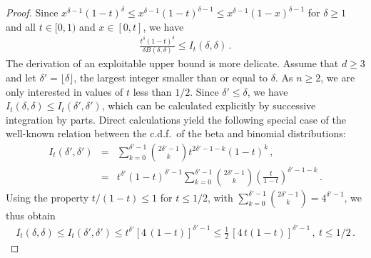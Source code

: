 \documentclass{article}
\newcommand{\AZ}{\textcolor{blue}}
\newcommand{\bea}{\begin{eqnarray*}}
\newcommand{\eea}{\end{eqnarray*}}
\newcommand{\be}{\begin{eqnarray}}
\newcommand{\ee}{\end{eqnarray}}
\begin{document}
\begin{proof}
Since $x^{\delta-1}(1-t)^\delta\leq x^{\delta-1}(1-t)^{\delta-1}\leq x^{\delta-1}(1-x)^{\delta-1}$ for $\delta\geq 1$ and all $t\in[0,1)$ and $x\in[0,t]$, we have
\be\label{It-ineq1}
\frac{t^\delta (1-t)^\delta}{\delta B(\delta,\delta)} \leq I_t(\delta,\delta) \,. %
\ee
The derivation of an exploitable upper bound is more delicate.
Assume that $d \geq 3$ and let
$\delta'=\lfloor \delta \rfloor$, the largest integer smaller than or equal to $\delta$.
As $n\geq 2$, we are only interested in values of $t$ less than $1/2$. Since $\delta'\leq \delta$, we have $I_t(\delta,\delta) \leq I_t(\delta',\delta')$, which
can be calculated explicitly by successive integration by parts. Direct calculations yield the following special case of the well-known relation between the c.d.f.\ of the beta and binomial distributions:
\be\label{It1}
I_t(\delta',\delta') &=& \sum_{k=0}^{\delta'-1} \binom{2\delta'-1}{k} t^{2\delta'-1-k}(1-t)^k \,, \\
&=& t^{\delta'}(1-t)^{\delta'-1} \sum_{k=0}^{\delta'-1} \binom{2\delta'-1}{k} \left(\frac{t}{1-t}\right)^{\delta'-1-k} \,.
\ee
Using the property $t/(1-t) \leq 1$ for $t\leq 1/2$, with $\sum_{k=0}^{\delta'-1} \binom{2\delta'-1}{k}=4^{\delta'-1}$, we thus obtain
\be \label{upper_bound}
I_t(\delta,\delta) \leq I_t(\delta',\delta') \leq t^{\delta'}[4\,(1-t)]^{\delta'-1} \leq \frac12\,[4\,t(1-t)]^{\delta'-1}\,, \ t\leq 1/2\,.
\ee


\end{proof}
\end{document}
